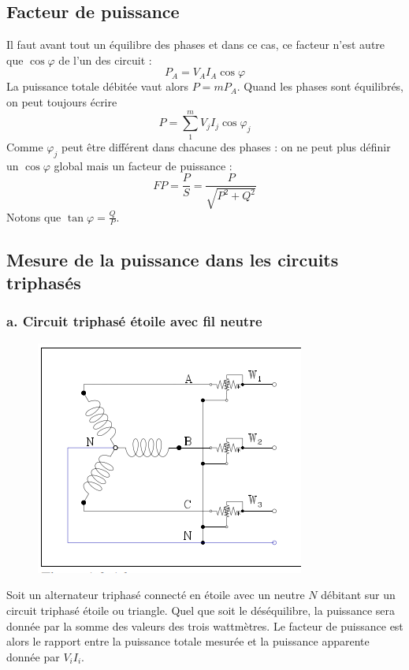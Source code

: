 \subsection{Facteur de puissance}
Il faut avant tout un équilibre des phases et dans ce cas, ce facteur n'est 
autre que $\cos\varphi$ de l'un des circuit : 
\begin{equation}
	P_A = V_AI_A\cos\varphi
\end{equation}
La puissance totale débitée vaut alors $P = mP_A$. Quand les phases sont 
équilibrés, on peut toujours écrire
\begin{equation}
	P = \sum_1^m V_jI_j\cos\varphi_j
\end{equation}
Comme $\varphi_j$ peut être différent dans chacune des phases : on ne peut 
plus définir un $\cos\varphi$ global mais un facteur de puissance :
\begin{equation}
	FP = \frac{P}{S} = \frac{P}{\sqrt{P^2+Q^2}}
\end{equation}
Notons que $\tan\varphi = \frac{Q}{P}$.
	
\subsection{Mesure de la puissance dans les circuits triphasés}
\subsubsection{a. Circuit triphasé étoile avec fil neutre}
\begin{figure}
	\vspace{-5mm}
	\includegraphics[scale=0.35]{ch1/image12.png}
\end{figure}

Soit un alternateur triphasé connecté en étoile avec un neutre $N$ 
débitant sur un circuit triphasé étoile ou triangle. Quel que soit 
le déséquilibre, la puissance sera donnée par la somme des valeurs 
des trois wattmètres. Le facteur de puissance est alors le rapport 
entre la puissance totale mesurée et la puissance apparente donnée 
par $V_iI_i$.\\
\\	
